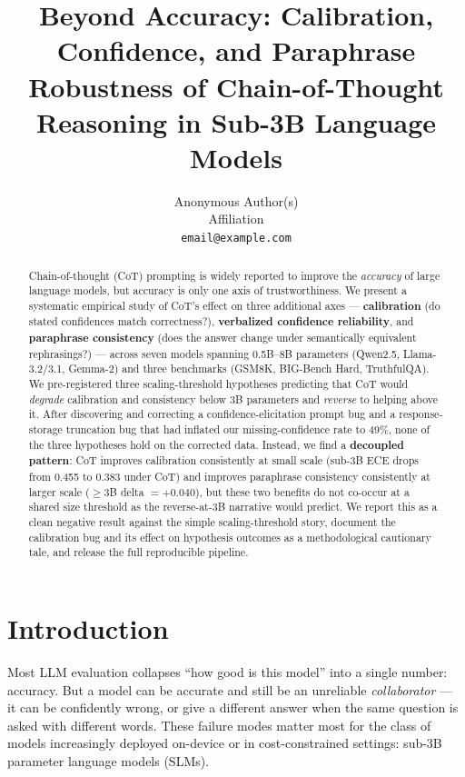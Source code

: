 \documentclass{article}
\title{Beyond Accuracy: Calibration, Confidence, and Paraphrase Robustness of Chain-of-Thought Reasoning in Sub-3B Language Models}
\author{%
  Anonymous Author(s) \\
  Affiliation \\
  \texttt{email@example.com}
}
\begin{document}
\maketitle

\begin{abstract}
Chain-of-thought (CoT) prompting is widely reported to improve the \emph{accuracy} of large language models, but accuracy is only one axis of trustworthiness. We present a systematic empirical study of CoT's effect on three additional axes --- \textbf{calibration} (do stated confidences match correctness?), \textbf{verbalized confidence reliability}, and \textbf{paraphrase consistency} (does the answer change under semantically equivalent rephrasings?) --- across seven models spanning 0.5B--8B parameters (Qwen2.5, Llama-3.2/3.1, Gemma-2) and three benchmarks (GSM8K, BIG-Bench Hard, TruthfulQA). We pre-registered three scaling-threshold hypotheses predicting that CoT would \emph{degrade} calibration and consistency below 3B parameters and \emph{reverse} to helping above it. After discovering and correcting a confidence-elicitation prompt bug and a response-storage truncation bug that had inflated our missing-confidence rate to 49\%, none of the three hypotheses hold on the corrected data. Instead, we find a \textbf{decoupled pattern}: CoT improves calibration consistently at small scale (sub-3B ECE drops from 0.455 to 0.383 under CoT) and improves paraphrase consistency consistently at larger scale ($\geq$3B delta $= +0.040$), but these two benefits do not co-occur at a shared size threshold as the reverse-at-3B narrative would predict. We report this as a clean negative result against the simple scaling-threshold story, document the calibration bug and its effect on hypothesis outcomes as a methodological cautionary tale, and release the full reproducible pipeline.
\end{abstract}

\section{Introduction}

Most LLM evaluation collapses ``how good is this model'' into a single number: accuracy. But a model can be accurate and still be an unreliable \emph{collaborator} --- it can be confidently wrong, or give a different answer when the same question is asked with different words. These failure modes matter most for the class of models increasingly deployed on-device or in cost-constrained settings: sub-3B parameter language models (SLMs).
\end{document}
